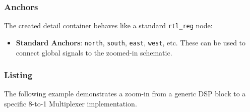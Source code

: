     \subsubsection{\sffamily Anchors}
        The created detail container behaves like a standard \texttt{rtl\_reg} node:
        \begin{itemize}
            \item \textbf{Standard Anchors}: \texttt{north}, \texttt{south}, \texttt{east}, \texttt{west}, etc. These can be used to connect global signals to the zoomed-in schematic.
        \end{itemize}

    \subsubsection{\sffamily Listing}
        The following example demonstrates a zoom-in from a generic DSP block to a specific 8-to-1 Multiplexer implementation.

\begin{RTLexample}
\end{RTLexample}